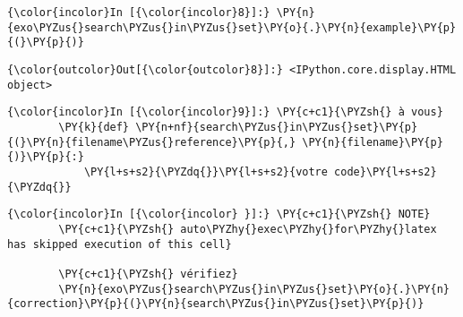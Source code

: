     \begin{Verbatim}[commandchars=\\\{\},frame=single,framerule=0.3mm,rulecolor=\color{cellframecolor}]
{\color{incolor}In [{\color{incolor}8}]:} \PY{n}{exo\PYZus{}search\PYZus{}in\PYZus{}set}\PY{o}{.}\PY{n}{example}\PY{p}{(}\PY{p}{)}
\end{Verbatim}


\begin{Verbatim}[commandchars=\\\{\},frame=single,framerule=0.3mm,rulecolor=\color{cellframecolor}]
{\color{outcolor}Out[{\color{outcolor}8}]:} <IPython.core.display.HTML object>
\end{Verbatim}
            
    \begin{Verbatim}[commandchars=\\\{\},frame=single,framerule=0.3mm,rulecolor=\color{cellframecolor}]
{\color{incolor}In [{\color{incolor}9}]:} \PY{c+c1}{\PYZsh{} à vous}
        \PY{k}{def} \PY{n+nf}{search\PYZus{}in\PYZus{}set}\PY{p}{(}\PY{n}{filename\PYZus{}reference}\PY{p}{,} \PY{n}{filename}\PY{p}{)}\PY{p}{:}
            \PY{l+s+s2}{\PYZdq{}}\PY{l+s+s2}{votre code}\PY{l+s+s2}{\PYZdq{}}
\end{Verbatim}


    \begin{Verbatim}[commandchars=\\\{\},frame=single,framerule=0.3mm,rulecolor=\color{cellframecolor}]
{\color{incolor}In [{\color{incolor} }]:} \PY{c+c1}{\PYZsh{} NOTE}
        \PY{c+c1}{\PYZsh{} auto\PYZhy{}exec\PYZhy{}for\PYZhy{}latex has skipped execution of this cell}
        
        \PY{c+c1}{\PYZsh{} vérifiez}
        \PY{n}{exo\PYZus{}search\PYZus{}in\PYZus{}set}\PY{o}{.}\PY{n}{correction}\PY{p}{(}\PY{n}{search\PYZus{}in\PYZus{}set}\PY{p}{)}
\end{Verbatim}



    
    
    
